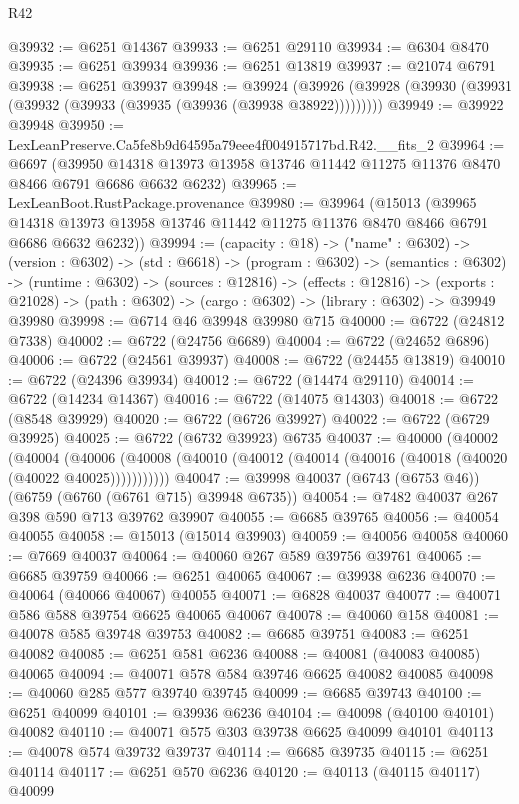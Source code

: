 \begin{lexlean}{R42}
\begin{coremodule}
{@39932 := @6251 @14367
@39933 := @6251 @29110
@39934 := @6304 @8470
@39935 := @6251 @39934
@39936 := @6251 @13819
@39937 := @21074 @6791
@39938 := @6251 @39937
@39948 := @39924
    (@39926 (@39928 (@39930 (@39931 (@39932 (@39933 (@39935 (@39936 (@39938 @38922)))))))))
@39949 := @39922 @39948
@39950 := LexLeanPreserve.Ca5fe8b9d64595a79eee4f004915717bd.R42.__fits_2
@39964 := @6697
    (@39950 @14318 @13973 @13958 @13746 @11442 @11275 @11376 @8470 @8466 @6791 @6686 @6632 @6232)
@39965 := LexLeanBoot.RustPackage.provenance
@39980 := @39964
    (@15013
      (@39965 @14318 @13973 @13958 @13746 @11442 @11275 @11376 @8470 @8466 @6791 @6686 @6632 @6232))
@39994 := (capacity : @18) ->
  ("name" : @6302) ->
  (version : @6302) ->
  (std : @6618) ->
  (program : @6302) ->
  (semantics : @6302) ->
  (runtime : @6302) ->
  (sources : @12816) ->
  (effects : @12816) ->
  (exports : @21028) -> (path : @6302) -> (cargo : @6302) -> (library : @6302) -> @39949 @39980
@39998 := @6714 @46 @39948 @39980 @715
@40000 := @6722 (@24812 @7338)
@40002 := @6722 (@24756 @6689)
@40004 := @6722 (@24652 @6896)
@40006 := @6722 (@24561 @39937)
@40008 := @6722 (@24455 @13819)
@40010 := @6722 (@24396 @39934)
@40012 := @6722 (@14474 @29110)
@40014 := @6722 (@14234 @14367)
@40016 := @6722 (@14075 @14303)
@40018 := @6722 (@8548 @39929)
@40020 := @6722 (@6726 @39927)
@40022 := @6722 (@6729 @39925)
@40025 := @6722 (@6732 @39923) @6735
@40037 := @40000
    (@40002
      (@40004
        (@40006 (@40008 (@40010 (@40012 (@40014 (@40016 (@40018 (@40020 (@40022 @40025)))))))))))
@40047 := @39998 @40037 (@6743 (@6753 @46)) (@6759 (@6760 (@6761 @715) @39948 @6735))
@40054 := @7482 @40037 @267 @398 @590 @713 @39762 @39907
@40055 := @6685 @39765
@40056 := @40054 @40055
@40058 := @15013 (@15014 @39903)
@40059 := @40056 @40058
@40060 := @7669 @40037
@40064 := @40060 @267 @589 @39756 @39761
@40065 := @6685 @39759
@40066 := @6251 @40065
@40067 := @39938 @6236
@40070 := @40064 (@40066 @40067) @40055
@40071 := @6828 @40037
@40077 := @40071 @586 @588 @39754 @6625 @40065 @40067
@40078 := @40060 @158
@40081 := @40078 @585 @39748 @39753
@40082 := @6685 @39751
@40083 := @6251 @40082
@40085 := @6251 @581 @6236
@40088 := @40081 (@40083 @40085) @40065
@40094 := @40071 @578 @584 @39746 @6625 @40082 @40085
@40098 := @40060 @285 @577 @39740 @39745
@40099 := @6685 @39743
@40100 := @6251 @40099
@40101 := @39936 @6236
@40104 := @40098 (@40100 @40101) @40082
@40110 := @40071 @575 @303 @39738 @6625 @40099 @40101
@40113 := @40078 @574 @39732 @39737
@40114 := @6685 @39735
@40115 := @6251 @40114
@40117 := @6251 @570 @6236
@40120 := @40113 (@40115 @40117) @40099
}
\end{coremodule}
\end{lexlean}
